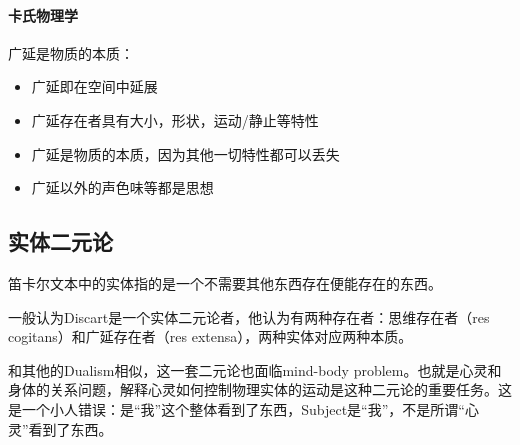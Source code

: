 \paragraph{卡氏物理学}

广延是物质的本质：

\begin{itemize}
    \item 广延即在空间中延展
    \item 广延存在者具有大小，形状，运动/静止等特性
    \item 广延是物质的本质，因为其他一切特性都可以丢失
    \item 广延以外的声色味等都是思想
\end{itemize}

\subsection{实体二元论}

笛卡尔文本中的实体指的是一个不需要其他东西存在便能存在的东西。

一般认为Discart是一个实体二元论者，他认为有两种存在者：思维存在者（res cogitans）和广延存在者（res extensa），两种实体对应两种本质。

和其他的Dualism相似，这一套二元论也面临mind-body problem。也就是心灵和身体的关系问题，解释心灵如何控制物理实体的运动是这种二元论的重要任务。这是一个小人错误：是“我”这个整体看到了东西，Subject是“我”，不是所谓“心灵”看到了东西。

